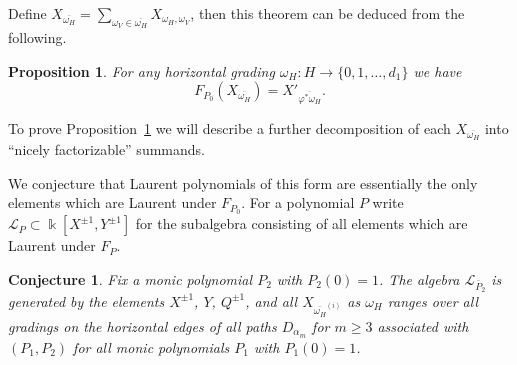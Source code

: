 \documentclass{amsart}
\newtheorem{conjecture}[theorem]{Conjecture}
\newtheorem{proposition}[theorem]{Proposition}
\newcommand{\cL}{\mathcal{L}}
\newcommand{\kk}{\Bbbk}
\begin{document}
Define $X_{\overline{\omega_H}}=\sum\limits_{\omega_V\in\overline{\omega_H}} X_{\omega_H,\omega_V}$, then this theorem can be deduced from the following.  
\begin{proposition}\label{prop:restricted}
 For any horizontal grading $\omega_H:H\to\{0,1,\ldots,d_1\}$ we have
 \[F_{P_0}(X_{\overline{\omega_H}})=X'_{\overline{\varphi^*\omega_H}}.\]
\end{proposition}
To prove Proposition~\ref{prop:restricted} we will describe a further decomposition of each $X_{\overline{\omega_H}}$ into ``nicely factorizable'' summands.  



We conjecture that Laurent polynomials of this form are essentially the only elements which are Laurent under $F_{P_0}$.  For a polynomial $P$ write $\cL_P\subset\kk[X^{\pm1},Y^{\pm1}]$ for the subalgebra consisting of all elements which are Laurent under $F_P$.
\begin{conjecture}
Fix a monic polynomial $P_2$ with $P_2(0)=1$.  The algebra $\cL_{\bar{P}_2}$ is generated by the elements $X^{\pm1}$, $Y$, $Q^{\pm1}$, and all $ X_{\overline{\omega_H}^{(i)}}$ as $\omega_H$ ranges over all gradings on the horizontal edges of all paths $D_{\alpha_m}$ for $m\ge3$ associated with $(P_1,P_2)$ for all monic polynomials $P_1$ with $P_1(0)=1$.
\end{conjecture}


\newpage
\end{document}
